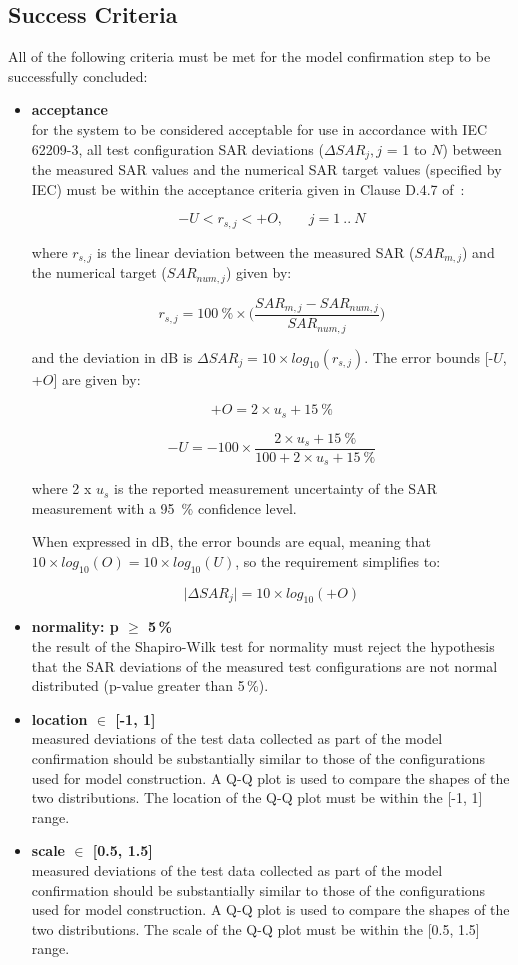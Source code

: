 \documentclass{article}
\begin{document}
\subsection{Success Criteria}\label{sec:quantities}

All of the following criteria must be met for the model confirmation step to be successfully concluded:

\begin{itemize}
\item \textbf{acceptance}\\ for the system to be considered acceptable for use in accordance with IEC 62209-3, all test configuration SAR deviations ($\Delta SAR_j, j$ = 1 to $N$) between the measured SAR values and the numerical SAR target values (specified by IEC) must be within the acceptance criteria given in Clause D.4.7 of~\cite{standard}:

\[
-U < r_{s,j} < +O, ~~~~~~~~ j = 1~..~N
\]

where $r_{s,j}$ is the linear deviation between the measured SAR ($SAR_{m,j}$) and the numerical target ($SAR_{num,j}$) given by:

\[
r_{s,j} = 100~\% \times \Big(\frac{SAR_{m,j} - SAR_{num,j}}{SAR_{num,j}}\Big)
\]

and the deviation in dB is $\Delta SAR_j = 10 \times log_{10} (r_{s,j})$. The error bounds [-$U$, +$O$] are given by:

\[
+O = 2 \times u_s + 15~\%
\]

\[
-U = -100 \times \frac{2 \times u_s + 15~\%}{100 + 2 \times u_s + 15~\%}
\]

where 2 x $u_s$ is the reported measurement uncertainty of the SAR measurement with a 95~\% confidence level.

When expressed in dB, the error bounds are equal, meaning that $10 \times log_{10}(O) = 10 \times log_{10}(U)$, so the requirement simplifies to:

\[
\big|\Delta SAR_j\big| = 10 \times log_{10}(+O)
\]

\item \textbf{normality: p $\ge$ 5\,\%}\\ the result of the Shapiro-Wilk test for normality must reject the hypothesis that the SAR deviations of the measured test configurations are not normal distributed (p-value greater than 5\,\%).
\item \textbf{location $\in$ [-1, 1]}\\
measured deviations of the test data collected as part of the model confirmation should be substantially similar to those of the configurations used for model construction. A Q-Q plot is used to compare the shapes of the two distributions. The location of the Q-Q plot must be within the [-1, 1] range.
\item \textbf{scale $\in$ [0.5, 1.5]}\\
measured deviations of the test data collected as part of the model confirmation should be substantially similar to those of the configurations used for model construction. A Q-Q plot is used to compare the shapes of the two distributions. The scale of the Q-Q plot must be within the [0.5, 1.5] range.
\end{itemize}
\end{document}
